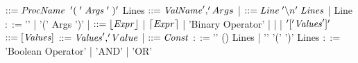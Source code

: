 \documentclass[11pt]{article}
\begin{document}
\newpage
\begin{codebox}
\zi {} $::= \id{ProcName} \;\;'(\;'\; \id{Args} \;'\;)'$
\zi \quad\quad\quad\quad\quad\quad\quad Lines
\zi {} $::= \id{ValName} ',' Args$
\zi \quad\quad\quad| 
\zi {} $::= \id{Line}\; '\backslash n'\; \id{Lines}$
\zi \quad\quad\quad| Line
\zi {} $::=$'' 
\zi  \quad\quad\quad|  '(' Args ')'
\zi \quad\quad\quad| 
\zi {} $::=\left \lfloor{\id{Expr}}\right \rfloor  $
\zi \quad\quad\quad| $\left \lceil{\id{Expr}}\right \rceil $
\zi \quad\quad\quad|  'Binary Operator' 
\zi \quad\quad\quad| 
\zi \quad\quad\quad| 
\zi \quad\quad\quad| $'['\id{Values}']'$
\zi {} $::=[\id{Values}]$
\zi {} $::= \id{Values} ',' Value$
\zi \quad\quad\quad| 
\zi {} $::= \id{Const}$
\zi {} $::= $'' ()
\zi \quad\quad\quad\quad Lines
\zi \quad\quad\quad| '' '('  ')'
\zi \quad\quad\quad\quad Lines
\zi {} $::=$  'Boolean Operator' 
\zi \quad\quad\quad|  'AND' 
\zi \quad\quad\quad|  'OR' 
\end{codebox}

\newpage
\end{document}
